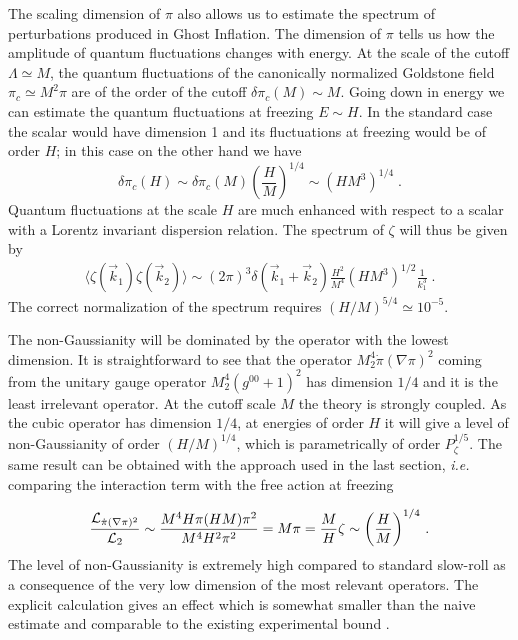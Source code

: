 \documentclass[12pt,letterpaper]{article}
\def\be{\begin{eqnarray}}
\def\ee{\end{eqnarray}}
\begin{document}
{The scaling dimension of $\pi$ also allows us to estimate the spectrum of
perturbations produced in Ghost Inflation. The dimension of $\pi$ tells
us how the amplitude of quantum fluctuations changes with energy. At
the scale of the cutoff $\Lambda \simeq M$, the quantum fluctuations
of the canonically normalized Goldstone field $\pi_c \simeq M^2 \pi $ are of the order of the
cutoff $\delta \pi_c (M)\sim M$. Going down in energy we can estimate
the quantum fluctuations at freezing $E \sim H$. In the standard case
the scalar would have dimension 1 and its fluctuations at freezing
would be of order $H$; in this case on the other hand we have
\begin{equation}
\delta\pi_c(H) \sim \delta\pi_c(M)
\left(\frac{H}{M}\right)^{1/4}\sim \left(H M^3\right)^{1/4} \;.
\end{equation}
Quantum fluctuations at the scale $H$ are much enhanced with respect
to a scalar with a Lorentz invariant dispersion relation. 
The spectrum of $\zeta$ will thus be given by \cite{Arkani-Hamed:2003uz}
\be
\label{eq:spectrumzetaghost}
\langle \zeta(\vec k_1) \zeta(\vec k_2)\rangle \sim (2 \pi)^3 \delta(\vec
k_1 + \vec k_2)  \frac{H^2}{M^4} (H M^3)^{1/2} \frac{1}{k_1^3} \;.
\ee
The correct normalization of the spectrum requires $(H/M)^{5/4} \simeq
10^{-5}$.



The non-Gaussianity will be dominated by the operator with the lowest
dimension. It is straightforward to see that the operator $M_2^4
\dot\pi (\nabla\pi)^2$ coming from the unitary gauge operator $M_2^4
(g^{00}+1)^2$ has dimension $1/4$ and it is the least irrelevant
operator.
At the cutoff scale $M$ the theory is strongly coupled. As the cubic
operator has dimension $1/4$, at energies of order $H$ it will give a
level of non-Gaussianity of order $(H/M)^{1/4}$, which is
parametrically of order $P_\zeta^{1/5}$. The same result can be
obtained with the approach used in the last section, {\em i.e.}
comparing the interaction term with the free action at freezing



\begin{equation}
\label{eq:NGghost}
\frac{{\cal L}_{\dot\pi(\nabla \pi)^2}}{{\cal L}_{2}}\sim
\frac{M^4 H \pi (H M) \pi^2}{M^4 H^2 \pi^2}=M \pi=\frac{M}{H}
\zeta\sim\left(\frac{H}{M}\right)^{1/4} \, .
\end{equation}
The level of non-Gaussianity is extremely high compared to standard
slow-roll as a consequence of the very low dimension of the most
relevant operators. The explicit calculation
\cite{Arkani-Hamed:2003uz} gives an effect which is
somewhat smaller than the naive estimate and comparable to the
existing experimental bound \cite{Creminelli:2006rz}.

}
\end{document}
